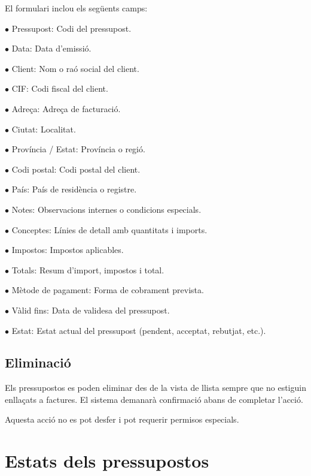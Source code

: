 \documentclass[a4paper]{article}
\begin{document}
El formulari inclou els següents camps:

\begin{compactitem}
\item[\color{myblue}$\bullet$] Pressupost: Codi del pressupost.
\item[\color{myblue}$\bullet$] Data: Data d'emissió.
\item[\color{myblue}$\bullet$] Client: Nom o raó social del client.
\item[\color{myblue}$\bullet$] CIF: Codi fiscal del client.
\item[\color{myblue}$\bullet$] Adreça: Adreça de facturació.
\item[\color{myblue}$\bullet$] Ciutat: Localitat.
\item[\color{myblue}$\bullet$] Província / Estat: Província o regió.
\item[\color{myblue}$\bullet$] Codi postal: Codi postal del client.
\item[\color{myblue}$\bullet$] País: País de residència o registre.
\item[\color{myblue}$\bullet$] Notes: Observacions internes o condicions especials.
\item[\color{myblue}$\bullet$] Conceptes: Línies de detall amb quantitats i imports.
\item[\color{myblue}$\bullet$] Impostos: Impostos aplicables.
\item[\color{myblue}$\bullet$] Totals: Resum d'import, impostos i total.
\item[\color{myblue}$\bullet$] Mètode de pagament: Forma de cobrament prevista.
\item[\color{myblue}$\bullet$] Vàlid fins: Data de validesa del pressupost.
\item[\color{myblue}$\bullet$] Estat: Estat actual del pressupost (pendent, acceptat, rebutjat, etc.).
\end{compactitem}

\hypertarget{toc75}{}
\subsection{Eliminació}

Els pressupostos es poden eliminar des de la vista de llista sempre que no estiguin enllaçats a factures.
El sistema demanarà confirmació abans de completar l'acció.

Aquesta acció no es pot desfer i pot requerir permisos especials.


\hypertarget{toc76}{}
\section{Estats dels pressupostos}
\end{document}
